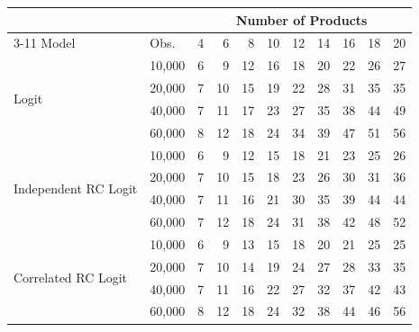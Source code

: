 \begin{tabular}{llrrrrrrrrr}
\toprule
 & & \multicolumn{9}{c}{Number of Products} \\
\cmidrule(l){3-11}
Model & Obs. & 4 & 6 & 8 & 10 & 12 & 14 & 16 & 18 & 20 \\
\midrule
\multirow{4}{*}{Logit} & 10,000 & 6 & 9 & 12 & 16 & 18 & 20 & 22 & 26 & 27 \\
 & 20{,}000 & 7 & 10 & 15 & 19 & 22 & 28 & 31 & 35 & 35 \\
 & 40{,}000 & 7 & 11 & 17 & 23 & 27 & 35 & 38 & 44 & 49 \\
 & 60{,}000 & 8 & 12 & 18 & 24 & 34 & 39 & 47 & 51 & 56 \\
\midrule
\multirow{4}{*}{Independent RC Logit} & 10,000 & 6 & 9 & 12 & 15 & 18 & 21 & 23 & 25 & 26 \\
 & 20{,}000 & 7 & 10 & 15 & 18 & 23 & 26 & 30 & 31 & 36 \\
 & 40{,}000 & 7 & 11 & 16 & 21 & 30 & 35 & 39 & 44 & 44 \\
 & 60{,}000 & 7 & 12 & 18 & 24 & 31 & 38 & 42 & 48 & 52 \\
\midrule
\multirow{4}{*}{Correlated RC Logit} & 10,000 & 6 & 9 & 13 & 15 & 18 & 20 & 21 & 25 & 25 \\
 & 20{,}000 & 7 & 10 & 14 & 19 & 24 & 27 & 28 & 33 & 35 \\
 & 40{,}000 & 7 & 11 & 16 & 22 & 27 & 32 & 37 & 42 & 43 \\
 & 60{,}000 & 8 & 12 & 18 & 24 & 32 & 38 & 44 & 46 & 56 \\
\bottomrule
\end{tabular}
